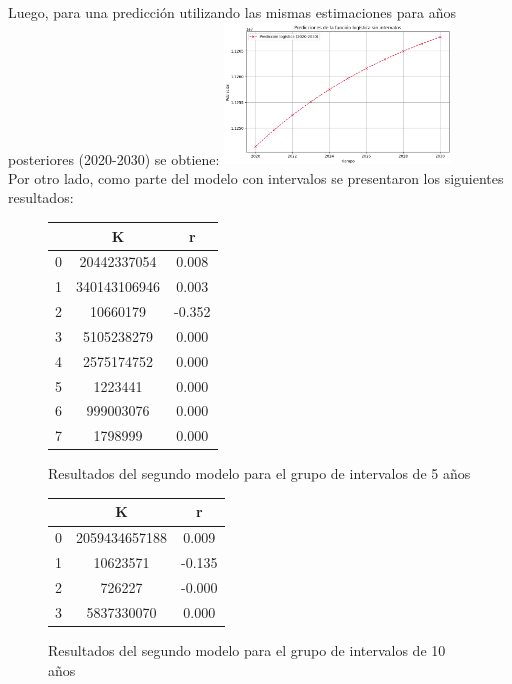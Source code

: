 \documentclass[a4paper,10pt,twocolumn]{article}
\begin{document}
Luego, para una predicción utilizando las mismas estimaciones para años posteriores (2020-2030) se obtiene:
\includegraphics[width=0.45\textwidth]{img/graph_sin_intervalos.png}
\\
Por otro lado, como parte del modelo con intervalos se presentaron los siguientes resultados:\\
	\begin{figure}[h!]%
		\begin{center}
			\begin{tabular}{|c|c|c|} \hline
			 			& K 			& r 		\\ \hline
			0 			& 20442337054 	& 0.008  	\\ \hline
			1			& 340143106946 	& 0.003 	\\ \hline
			2			& 	  10660179	& -0.352 	\\ \hline
			3 			&   5105238279	&  0.000	\\ \hline
			4 			& 	2575174752	&  0.000 	\\ \hline
			5 			& 	   1223441	&  0.000	\\ \hline
			6 			& 	 999003076	&  0.000 	\\ \hline
			7 			& 	   1798999	&  0.000 	\\ \hline
			\end{tabular}
		\caption{Resultados del segundo modelo para el grupo de intervalos de 5 años \label{fig:ex}}
	\end{center}
\end{figure}
\begin{figure}[h!]%
	\begin{center}
		\begin{tabular}{|c|c|c|} \hline
					 & K 			& r 		\\ \hline
			0		 & 2059434657188& 0.009		\\ \hline
			1		 &10623571		& -0.135	\\ \hline
			2		 & 726227		& -0.000	\\ \hline
			3		 & 5837330070	& 0.000		\\ \hline
		\end{tabular}
	\caption{Resultados del segundo modelo para el grupo de intervalos de 10 años \label{fig:ex}}
	\end{center}
\end{figure}
\end{document}
